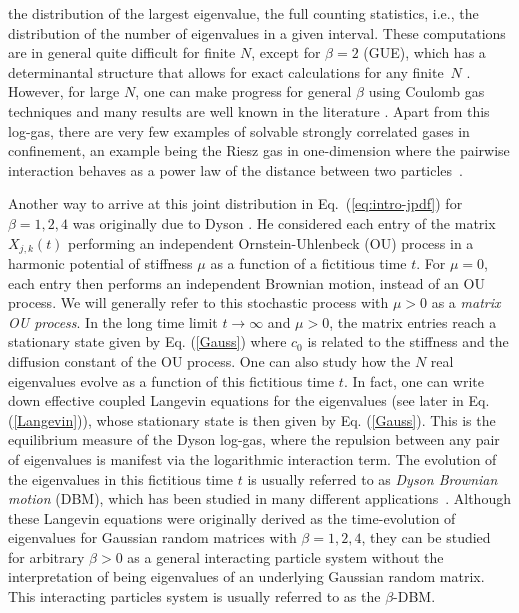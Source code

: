 \documentclass[onecolumn,superscriptaddress,
 amsmath,amssymb,
 aps,
 prd,
]{revtex4-1}
\begin{document}
the distribution of the largest eigenvalue, the full counting statistics, i.e., the distribution of the number of eigenvalues in a given interval. These computations are in general quite difficult for finite $N$, except for $\beta = 2$ (GUE), which has a determinantal structure that allows for exact calculations for any finite~$N$ \cite{M91,F10}. However, for large $N$, one can make progress for general $\beta$ using Coulomb gas techniques and many results are well known in the literature \cite{M91,F10}. Apart from this log-gas, there are very few examples of solvable strongly correlated gases in confinement, an example being the Riesz gas in one-dimension where the pairwise interaction behaves as a power law of the distance between two particles~\cite{Agar19,Lew22,Ket24}. 

Another way to arrive at this joint distribution in Eq.~(\ref{eq:intro-jpdf}) for $\beta = 1,2, 4$ was originally due to Dyson \cite{D62}. He considered each entry of the matrix $X_{j,k}(t)$ performing an independent Ornstein-Uhlenbeck (OU) process in a harmonic potential of stiffness $\mu$ as a function of a fictitious time $t$. For $\mu=0$, each entry then performs an independent Brownian motion, instead of an OU process. We will generally refer to this stochastic process with $\mu >0$ as a {\it matrix OU process}.
In the long time limit $t \to \infty$ and $\mu >0$, the matrix entries reach a stationary state given by Eq. (\ref{Gauss}) where $c_0$ is related to the stiffness and the diffusion constant of the OU process. One can also study how the $N$ real eigenvalues evolve as a function of this fictitious time $t$. In fact, one can write down effective coupled  Langevin equations for the eigenvalues (see later in Eq. (\ref{Langevin})), whose stationary state is then given by Eq. (\ref{Gauss}). This is the equilibrium measure of the Dyson log-gas, where the repulsion between any pair of eigenvalues is manifest via the logarithmic interaction term. The evolution of the eigenvalues in this fictitious time $t$ is usually referred to as {\it Dyson Brownian motion} (DBM), which has been studied in many different applications~\cite{KT04,Bor09,ABG12,GMS21,MM21,TLS23}. Although these Langevin equations were originally derived as the time-evolution of eigenvalues for Gaussian random matrices with $\beta = 1,2,4$, they can be studied for arbitrary $\beta>0$ as a general interacting particle system without the interpretation of being eigenvalues of an underlying Gaussian random matrix. This interacting particles system is usually referred to as the $\beta$-DBM. 
\end{document}
